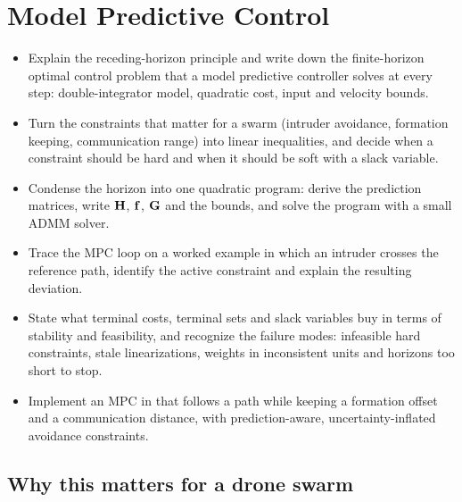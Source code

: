\chapter{Model Predictive Control}
\label{ch:ch21}

\begin{objectives}
\begin{itemize}
  \item Explain the receding-horizon principle and write down the finite-horizon optimal control problem that a model predictive controller solves at every step: double-integrator model, quadratic cost, input and velocity bounds.
  \item Turn the constraints that matter for a swarm (intruder avoidance, formation keeping, communication range) into linear inequalities, and decide when a constraint should be hard and when it should be soft with a slack variable.
  \item Condense the horizon into one quadratic program: derive the prediction matrices, write $\mathbf{H}$, $\mathbf{f}$, $\mathbf{G}$ and the bounds, and solve the program with a small ADMM solver.
  \item Trace the MPC loop on a worked example in which an intruder crosses the reference path, identify the active constraint and explain the resulting deviation.
  \item State what terminal costs, terminal sets and slack variables buy in terms of stability and feasibility, and recognize the failure modes: infeasible hard constraints, stale linearizations, weights in inconsistent units and horizons too short to stop.
  \item Implement an MPC in \python that follows a path while keeping a formation offset and a communication distance, with prediction-aware, uncertainty-inflated avoidance constraints.
\end{itemize}
\end{objectives}

\section{Why this matters for a drone swarm}
\label{sec:ch21-motivation}

